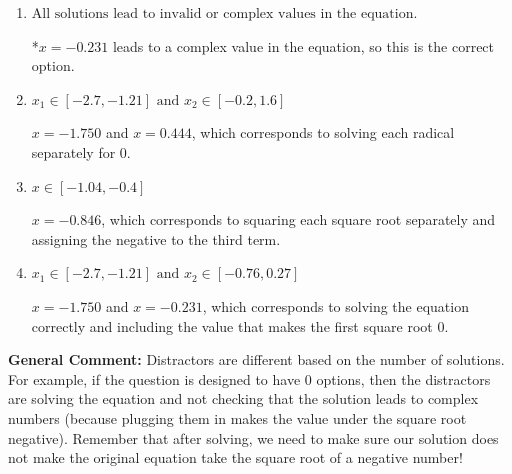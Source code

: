 \documentclass{extbook}[14pt]
\begin{document}
\begin{enumerate}
{\begin{enumerate}[label=\Alph*.]
This corresponds to not checking that the potential solution $x = -0.231$ leads to a complex value in the original equation.
\item \( \text{All solutions lead to invalid or complex values in the equation.} \)

*$x = -0.231$ leads to a complex value in the equation, so this is the correct option.
\item \( x_1 \in [-2.7, -1.21] \text{ and } x_2 \in [-0.2,1.6] \)

$x = -1.750$ and $x = 0.444$, which corresponds to solving each radical separately for 0.
\item \( x \in [-1.04,-0.4] \)

$x = -0.846$, which corresponds to squaring each square root separately and assigning the negative to the third term.
\item \( x_1 \in [-2.7, -1.21] \text{ and } x_2 \in [-0.76,0.27] \)

$x = -1.750$ and $x = -0.231$, which corresponds to solving the equation correctly and including the value that makes the first square root 0.
\end{enumerate}

\textbf{General Comment:} Distractors are different based on the number of solutions. For example, if the question is designed to have 0 options, then the distractors are solving the equation and not checking that the solution leads to complex numbers (because plugging them in makes the value under the square root negative). Remember that after solving, we need to make sure our solution does not make the original equation take the square root of a negative number!
}
\end{enumerate}
\end{document}
